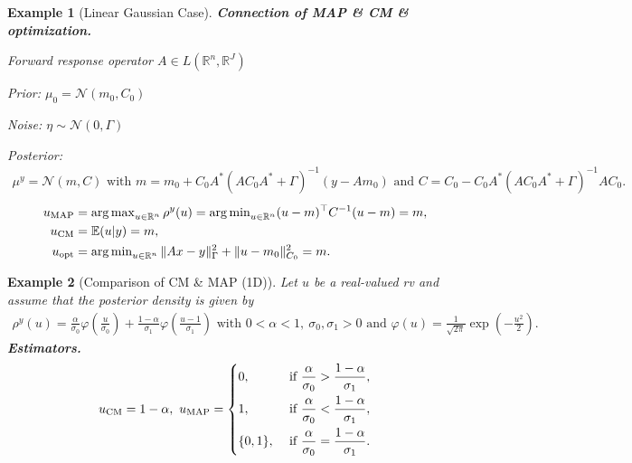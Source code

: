 \documentclass[oneside,11pt]{book}
\numberwithin{equation}{section}
\newtheorem{example}{Example}[section]
\begin{document}
\begin{example}[Linear Gaussian Case]
    \textbf{Connection of MAP \& CM \& optimization.}
    
    Forward response operator $A\in L(\mathbb{R}^n,\mathbb{R}^J)$
    
    Prior: $\mu_0 = \mathcal{N}(m_0,C_0)$
    
    Noise: $\eta\sim\mathcal{N}(0,\Gamma)$
    
    Posterior:
    \begin{align*}
        \mu^y = \mathcal{N}(m,C) \mbox{ with } m = m_0 + C_0A^*(AC_0A^* + \Gamma)^{-1}(y - Am_0) \mbox{ and } C = C_0 - C_0A^*(AC_0A^* + \Gamma)^{-1}AC_0.
    \end{align*}
    \begin{align*}
        u_{\rm MAP} &= \operatorname{arg\max}_{u\in\mathbb{R}^n} \rho^y(u) = \operatorname{arg\min}_{u\in\mathbb{R}^n} (u - m)^\top C^{-1}(u - m) = m,\\
        u_{\rm CM} &= \mathbb{E}(u|y) = m,\\
        u_{\rm opt} &= \operatorname{arg\min}_{u\in\mathbb{R}^n} \|Ax - y\|_\Gamma^2 + \|u - m_0\|_{C_0}^2 = m.
    \end{align*}
\end{example}

\begin{example}[Comparison of CM \& MAP (1D)]
    Let $u$ be a real-valued rv and assume that the posterior density is given by
    \begin{align*}
        \rho^y(u) = \frac{\alpha}{\sigma_0}\varphi\left(\frac{u}{\sigma_0}\right) + \frac{1 - \alpha}{\sigma_1}\varphi\left(\frac{u - 1}{\sigma_1}\right) \mbox{ with } 0 < \alpha < 1,\ \sigma_0,\sigma_1 > 0 \mbox{ and } \varphi(u) = \frac{1}{\sqrt{2\pi}}\exp\left(-\frac{u^2}{2}\right).
    \end{align*}
    \textbf{Estimators.}
    \begin{equation*}
        u_{\rm CM} = 1 - \alpha,\ u_{\rm MAP} = \left\{\begin{split}
            &0, &&\mbox{ if } \frac{\alpha}{\sigma_0} > \frac{1 - \alpha}{\sigma_1},\\
            &1, &&\mbox{ if } \frac{\alpha}{\sigma_0} < \frac{1 - \alpha}{\sigma_1},\\
            &\{0,1\}, &&\mbox{ if } \frac{\alpha}{\sigma_0} = \frac{1 - \alpha}{\sigma_1}.
        \end{split}\right.
    \end{equation*}
\end{example}
\end{document}
